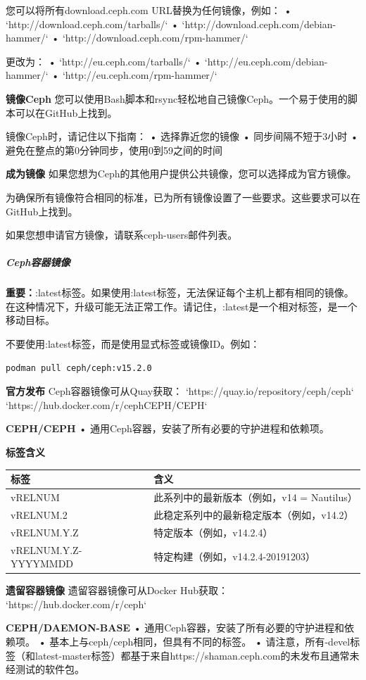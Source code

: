 \documentclass[12pt,UTF8]{ctexbook}
\begin{document}
您可以将所有download.ceph.com URL替换为任何镜像，例如：
• `http://download.ceph.com/tarballs/`
• `http://download.ceph.com/debian-hammer/`
• `http://download.ceph.com/rpm-hammer/`

更改为：
• `http://eu.ceph.com/tarballs/`
• `http://eu.ceph.com/debian-hammer/`
• `http://eu.ceph.com/rpm-hammer/`

\textbf{镜像Ceph}
您可以使用Bash脚本和rsync轻松地自己镜像Ceph。一个易于使用的脚本可以在GitHub上找到。

镜像Ceph时，请记住以下指南：
• 选择靠近您的镜像
• 同步间隔不短于3小时
• 避免在整点的第0分钟同步，使用0到59之间的时间

\textbf{成为镜像}
如果您想为Ceph的其他用户提供公共镜像，您可以选择成为官方镜像。

为确保所有镜像符合相同的标准，已为所有镜像设置了一些要求。这些要求可以在GitHub上找到。

如果您想申请官方镜像，请联系ceph-users邮件列表。

\subparagraph{Ceph容器镜像}

\textbf{重要：}:latest标签。如果使用:latest标签，无法保证每个主机上都有相同的镜像。在这种情况下，升级可能无法正常工作。请记住，:latest是一个相对标签，是一个移动目标。

不要使用:latest标签，而是使用显式标签或镜像ID。例如：
\begin{verbatim}
podman pull ceph/ceph:v15.2.0
\end{verbatim}

\textbf{官方发布}
Ceph容器镜像可从Quay获取：
`https://quay.io/repository/ceph/ceph`
`https://hub.docker.com/r/cephCEPH/CEPH`

\textbf{CEPH/CEPH}
• 通用Ceph容器，安装了所有必要的守护进程和依赖项。

\textbf{标签含义}
\begin{tabular}{ll}
\textbf{标签} & \textbf{含义} \\
\hline
vRELNUM & 此系列中的最新版本（例如，v14 = Nautilus） \\
vRELNUM.2 & 此稳定系列中的最新稳定版本（例如，v14.2） \\
vRELNUM.Y.Z & 特定版本（例如，v14.2.4） \\
vRELNUM.Y.Z-YYYYMMDD & 特定构建（例如，v14.2.4-20191203） \\
\end{tabular}

\textbf{遗留容器镜像}
遗留容器镜像可从Docker Hub获取：
`https://hub.docker.com/r/ceph`

\textbf{CEPH/DAEMON-BASE}
• 通用Ceph容器，安装了所有必要的守护进程和依赖项。
• 基本上与ceph/ceph相同，但具有不同的标签。
• 请注意，所有-devel标签（和latest-master标签）都基于来自https://shaman.ceph.com的未发布且通常未经测试的软件包。
\end{document}
